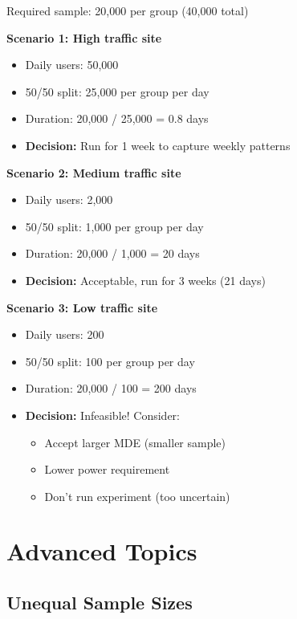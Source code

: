 \begin{example}
Required sample: 20,000 per group (40,000 total)

\textbf{Scenario 1: High traffic site}
\begin{itemize}
    \item Daily users: 50,000
    \item 50/50 split: 25,000 per group per day
    \item Duration: 20,000 / 25,000 = 0.8 days
    \item \textbf{Decision:} Run for 1 week to capture weekly patterns
\end{itemize}

\textbf{Scenario 2: Medium traffic site}
\begin{itemize}
    \item Daily users: 2,000
    \item 50/50 split: 1,000 per group per day
    \item Duration: 20,000 / 1,000 = 20 days
    \item \textbf{Decision:} Acceptable, run for 3 weeks (21 days)
\end{itemize}

\textbf{Scenario 3: Low traffic site}
\begin{itemize}
    \item Daily users: 200
    \item 50/50 split: 100 per group per day
    \item Duration: 20,000 / 100 = 200 days
    \item \textbf{Decision:} Infeasible! Consider:
    \begin{itemize}
        \item Accept larger MDE (smaller sample)
        \item Lower power requirement
        \item Don't run experiment (too uncertain)
    \end{itemize}
\end{itemize}
\end{example}

\section{Advanced Topics}

\subsection{Unequal Sample Sizes}

